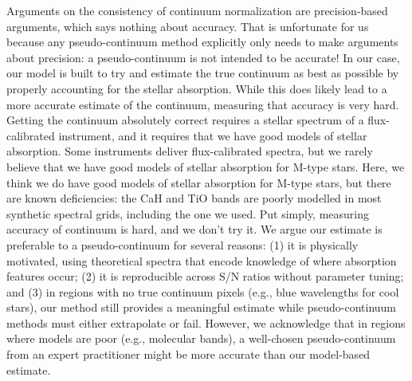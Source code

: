 \documentclass[modern,linenumbers]{aastex631}
\renewcommand{\added}[1]{#1}
\newcommand{\removed}[1]{}
\begin{document}
Arguments on the consistency of continuum normalization are precision-based arguments, which says nothing about accuracy. That is unfortunate for us because any pseudo-continuum method explicitly only needs to make arguments about precision: a pseudo-continuum is not intended to be accurate! In our case, our model is built to try and estimate the true continuum as best as possible by properly accounting for the stellar absorption. While this does likely lead to a more accurate estimate of the continuum, measuring that accuracy is very hard. Getting the continuum absolutely correct requires a stellar spectrum of a flux-calibrated instrument, and it requires that we have good models of stellar absorption. Some instruments deliver flux-calibrated spectra, but we rarely believe that we have good models of stellar absorption for M-type stars. Here, we think we do have good models of stellar absorption for M-type stars, but there are known deficiencies: the CaH and TiO bands are poorly modelled in most synthetic spectral grids, including the one we used. %
Put simply, measuring accuracy of continuum is hard, and we don't try it\added{. We argue our estimate is preferable to a pseudo-continuum for several reasons: (1) it is physically motivated, using theoretical spectra that encode knowledge of where absorption features occur; (2) it is reproducible across S/N ratios without parameter tuning; and (3) in regions with no true continuum pixels (e.g., blue wavelengths for cool stars), our method still provides a meaningful estimate while pseudo-continuum methods must either extrapolate or fail. However, we acknowledge that in regions where models are poor (e.g., molecular bands), a well-chosen pseudo-continuum from an expert practitioner might be more accurate than our model-based estimate}.\removed{, but we think our continuum estimate is better than a pseudo-continum.}\\
\end{document}
